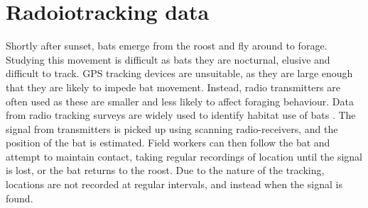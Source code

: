 \section{Radoiotracking data}

Shortly after sunset, bats emerge from the roost and fly around to forage. Studying this movement is difficult as bats they are nocturnal, elusive and difficult to track. GPS tracking devices are unsuitable, as they are large enough that they are likely to impede bat movement. Instead, radio transmitters are often used as these are smaller and less likely to affect foraging behaviour. Data from radio tracking surveys are widely used to identify habitat use of bats \cite{Bontadina2002, Encarnacao2005}.  The signal from transmitters is picked up using scanning radio-receivers, and the position of the bat is estimated. Field workers can then follow the bat and attempt to maintain contact, taking regular recordings of location until the signal is lost, or the bat returns to the roost. Due to the nature of the tracking, locations are not recorded at regular intervals, and instead when the signal is found.

